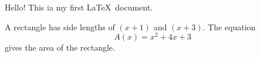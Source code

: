 \documentclass[11pt]{article}
\begin{document}
Hello! This ia my first \LaTeX\ document.

A rectangle has side lengths of $(x+1)$ and $(x+3)$.
The equation $${A(x)=x^2+4x+3}$$ gives the area of the rectangle.
\end{document}
